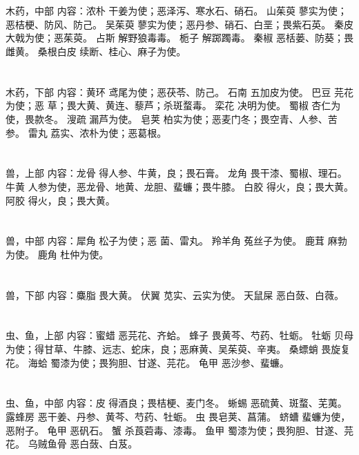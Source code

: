 \documentclass[12pt,UTF8]{ctexbook}
\begin{document}
\chapter{}木药，中部
内容：浓朴 干姜为使；恶泽泻、寒水石、硝石。 
山茱萸 蓼实为使；恶桔梗、防风、防己。 
吴茱萸 蓼实为使；恶丹参、硝石、白垩；畏紫石英。 
秦皮 大戟为使；恶茱萸。 
占斯 解野狼毒毒。 
栀子 解踯躅毒。 
秦椒 恶栝蒌、防葵；畏雌黄。 
桑根白皮 续断、桂心、麻子为使。 


\chapter{}木药，下部
内容：黄环 鸢尾为使；恶茯苓、防己。 
石南 五加皮为使。 
巴豆 芫花为使；恶 草；畏大黄、黄连、藜芦；杀斑蝥毒。 
栾花 决明为使。 
蜀椒 杏仁为使，畏款冬。 
溲疏 漏芦为使。 
皂荚 柏实为使；恶麦门冬；畏空青、人参、苦参。 
雷丸 荔实、浓朴为使；恶葛根。 


\chapter{}兽，上部
内容：龙骨 得人参、牛黄，良；畏石膏。 
龙角 畏干漆、蜀椒、理石。 
牛黄 人参为使，恶龙骨、地黄、龙胆、蜚蠊；畏牛膝。 
白胶 得火，良；畏大黄。 
阿胶 得火，良；畏大黄。 


\chapter{}兽，中部
内容：犀角 松子为使；恶 菌、雷丸。 
羚羊角 菟丝子为使。 
鹿茸 麻勃为使。 
鹿角 杜仲为使。 


\chapter{}兽，下部
内容：麋脂 畏大黄。 
伏翼 苋实、云实为使。 
天鼠屎 恶白蔹、白薇。 


\chapter{}虫、鱼，上部
内容：蜜蜡 恶芫花、齐蛤。 
蜂子 畏黄芩、芍药、牡蛎。 
牡蛎 贝母为使；得甘草、牛膝、远志、蛇床，良；恶麻黄、吴茱萸、辛夷。 
桑螵蛸 畏旋复花。 
海蛤 蜀漆为使；畏狗胆、甘遂、芫花。 
龟甲 恶沙参、蜚蠊。 


\chapter{}虫、鱼，中部
内容：皮 得酒良；畏桔梗、麦门冬。 
蜥蜴 恶硫黄、斑蝥、芜荑。 
露蜂房 恶干姜、丹参、黄芩、芍药、牡蛎。 
虫 畏皂荚、菖蒲。 
蛴螬 蜚蠊为使，恶附子。 
龟甲 恶矾石。 
蟹 杀莨菪毒、漆毒。 
鱼甲 蜀漆为使；畏狗胆、甘遂、芫花。 
乌贼鱼骨 恶白蔹、白芨。 
\end{document}
